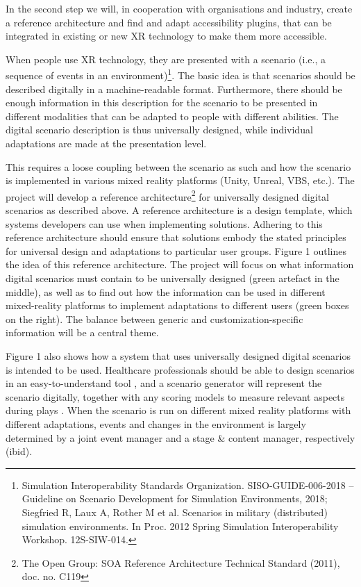 In the second step we will, in cooperation with organisations and industry, create a reference architecture and find and
adapt accessibility plugins, that can be integrated in existing or new XR technology to make them more accessible. 

When people use XR technology, they are presented with a scenario (i.e., a sequence of events in an
environment)\footnote{Simulation Interoperability Standards Organization. SISO-GUIDE-006-2018 – Guideline on
Scenario Development for Simulation Environments, 2018; Siegfried R, Laux A, Rother M et al. Scenarios in
military (distributed) simulation environments. In Proc. 2012 Spring Simulation Interoperability Workshop.
12S-SIW-014.}. The basic idea is that scenarios should be described digitally in a machine-readable format.
Furthermore, there should be enough information in this description for the scenario to be presented in different
modalities that can be adapted to people with different abilities. The digital scenario description is thus universally
designed, while individual adaptations are made at the presentation level. 

This requires a loose coupling between the scenario as such and how the scenario is implemented in various mixed reality
platforms (Unity, Unreal, VBS, etc.). The project will develop a reference architecture\footnote{The Open Group: SOA
Reference Architecture Technical Standard (2011), doc. no. C119} \autocite{hannay-vandenBerg-NATO-2017}
for universally designed digital scenarios as described
above. A reference architecture is a design template, which systems developers can use when implementing solutions.
Adhering to this reference architecture should ensure that solutions embody the stated principles for universal design
and adaptations to particular user groups. Figure 1 outlines the idea of this reference architecture. The project will
focus on what information digital scenarios must contain to be universally designed (green artefact in the middle), as
well as to find out how the information can be used in different mixed-reality platforms to implement adaptations to
different users (green boxes on the right). The balance between generic and customization-specific information will be
a central theme.

Figure 1 \WVL{[tbd.]} also shows how a system that uses universally designed digital scenarios is intended to be used. Healthcare
professionals should be able to design scenarios in an easy-to-understand tool 
\autocite{10.1007/978-3-030-50732-9_60,Hannay2019StructuredCT}, 
and a scenario generator will represent the scenario digitally, together with any scoring models to
measure relevant aspects during plays \autocite{DashleyK.RouwendalvanSchijndel_etal2020}. 
When the scenario is run on different mixed reality
platforms with different adaptations, events and changes in the environment is largely determined by a joint event
manager and a stage \& content manager, respectively (ibid). 

